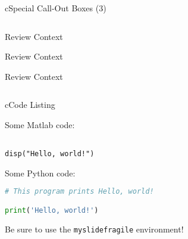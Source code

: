 \begin{myslide}{c}{Special Call-Out Boxes (3)}

\begin{columns}

\begin{column}{1\textwidth}

\begin{itemize}

\itembox
\begin{myoptional}
\lipsum[1][1-6]
\end{myoptional}

\itembox
\begin{myreview}{Review Context}
\lipsum[2][1-3]
\end{myreview}

\begin{itemize}

\itembox
\begin{myreview}{Review Context}
\lipsum[2][1-3]
\end{myreview}

\begin{itemize}

\itembox
\begin{myreview}{Review Context}
\lipsum[2][1-3]
\end{myreview}

\end{itemize}

\end{itemize}

\end{itemize}

\end{column}

\end{columns}

\end{myslide}

\begin{myslidefragile}{c}{Code Listing}

Some Matlab code:
\begin{lstlisting}[xleftmargin=0pt]
% This program prints Hello, world!

disp("Hello, world!")
\end{lstlisting}

Some Python code:
\begin{lstlisting}[xleftmargin=0pt,language=Python]
# This program prints Hello, world!

print('Hello, world!')
\end{lstlisting}

Be sure to use the \lstinline{myslidefragile} environment!

\end{myslidefragile}